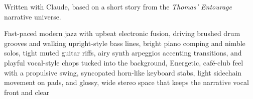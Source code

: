 
\begin{notes}
Written with Claude, based on a short story from the \emph{Thomas’ Entourage} narrative universe.
\end{notes}
\begin{style}
Fast-paced modern jazz with upbeat electronic fusion, driving brushed drum grooves and walking upright-style bass lines, bright piano comping and nimble solos, tight muted guitar riffs, airy synth arpeggios accenting transitions, and playful vocal-style chops tucked into the background, Energetic, café-club feel with a propulsive swing, syncopated horn-like keyboard stabs, light sidechain movement on pads, and glossy, wide stereo space that keeps the narrative vocal front and clear
\end{style}
